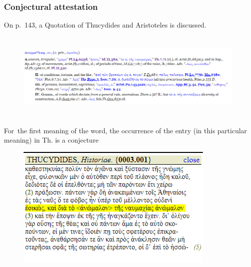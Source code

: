 \documentclass[10pt]{article}
\begin{document}
\subsubsection*{Conjectural attestation}
 On p.~143,  a Quotation of Thucydides and Aristoteles is discussed. \par








\begin{figure}[H]
\advance\leftskip 0.12in		\includegraphics[width=6.27in,height=1.69in]{./image13.png}
\end{figure}



\par

 For\ the first meaning of the word, the occurrence of the entry (in this particular meaning)  in Th. is a conjecture\par




\begin{figure}[H]
	\begin{Center}
		\includegraphics[width=3.8in,height=2.36in]{./image16.png}
	\end{Center}
\end{figure}
\end{document}
